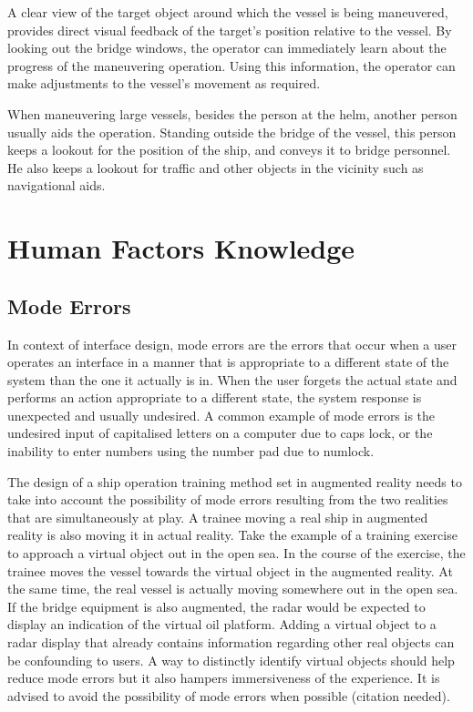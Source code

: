 A clear view of the target object around which the vessel is being maneuvered, provides direct visual feedback of the target’s position relative to the vessel. By looking out the bridge windows, the operator can immediately learn about the progress of the maneuvering operation. Using this information, the operator can make adjustments to the vessel's movement as required.

When maneuvering large vessels, besides the person at the helm, another person usually aids the operation. Standing outside the bridge of the vessel, this person keeps a lookout for the position of the ship, and conveys it to bridge personnel. He also keeps a lookout for traffic and other objects in the vicinity such as navigational aids.

\section{Human Factors Knowledge}
\subsection{Mode Errors}
In context of interface design, mode errors are the errors that occur when a user operates an interface in a manner that is appropriate to a different state of the system than the one it actually is in. When the user forgets the actual state and performs an action appropriate to a different state, the system response is unexpected and usually undesired. A common example of mode errors is the undesired input of capitalised letters on a computer due to caps lock, or the inability to enter numbers using the number pad due to numlock. 

The design of a ship operation training method set in augmented reality needs to take into account the possibility of mode errors resulting from the two realities that are simultaneously at play. A trainee moving a real ship in augmented reality is also moving it in actual reality. Take the example of a training exercise to approach a virtual object out in the open sea. In the course of the exercise, the trainee moves the vessel towards the virtual object in the augmented reality. At the same time, the real vessel is actually moving somewhere out in the open sea. If the bridge equipment is also augmented, the radar would be expected to display an indication of the virtual oil platform. Adding a virtual object to a radar display that already contains information regarding other real objects can be confounding to users. A way to distinctly identify virtual objects should help reduce mode errors but it also hampers immersiveness of the experience. 
It is advised to avoid the possibility of mode errors when possible (citation needed). 

